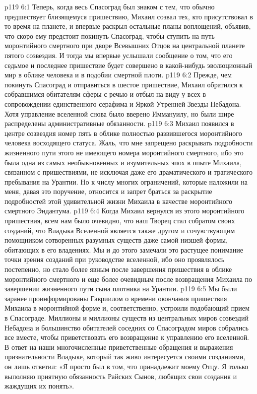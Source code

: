 \vs p119 6:1 Теперь, когда весь Спасоград был знаком с тем, что обычно предшествует близящемуся пришествию, Михаил созвал тех, кто присутствовал в то время на планете, и впервые раскрыл остальные планы воплощений, объявив, что скоро ему предстоит покинуть Спасоград, чтобы ступить на путь моронтийного смертного при дворе Всевышних Отцов на центральной планете пятого созвездия. И тогда мы впервые услышали сообщение о том, что его седьмое и последнее пришествие будет совершено в какой\hyp{}нибудь эволюционный мир в облике человека и в подобии смертной плоти.
\vs p119 6:2 Прежде, чем покинуть Спасоград и отправиться в шестое пришествие, Михаил обратился к собравшимся обитателям сферы с речью и отбыл на виду у всех в сопровождении единственного серафима и Яркой Утренней Звезды Небадона. Хотя управление вселенной снова было вверено Иммануилу, но были шире распределены административные обязанности.
\vs p119 6:3 Михаил появился в центре созвездия номер пять в облике полностью развившегося моронтийного человека восходящего статуса. Жаль, что мне запрещено раскрывать подробности жизненного пути этого не имеющего номера моронтийного смертного, ибо это была одна из самых необыкновенных и изумительных эпох в опыте Михаила, связанном с пришествиями, не исключая даже его драматического и трагического пребывания на Урантии. Но к числу многих ограничений, которые наложили на меня, давая это поручение, относится и запрет браться за раскрытие подробностей этой удивительной жизни Михаила в качестве моронтийного смертного Эндантума.
\vs p119 6:4 Когда Михаил вернулся из этого моронтийного пришествия, всем нам было очевидно, что наш Творец стал собратом своих созданий, что Владыка Вселенной является также другом и сочувствующим помощником сотворенных разумных существ даже самой низшей формы, обитающих в его владениях. Мы и до этого замечали это растущее понимание точки зрения созданий при руководстве вселенной, ибо оно проявлялось постепенно, но стало более явным после завершения пришествия в облике моронтийного смертного и еще более очевидным после возвращения Михаила по завершении жизненного пути сына плотника на Урантии.
\vs p119 6:5 Мы были заранее проинформированы Гавриилом о времени окончания пришествия Михаила в моронтийной форме и, соответственно, устроили подобающий прием в Спасограде. Миллионы и миллионы существ из центральных миров созвездий Небадона и большинство обитателей соседних со Спасоградом миров собрались все вместе, чтобы приветствовать его возвращение к управлению его вселенной. В ответ на наши многочисленные приветственные обращения и выражения признательности Владыке, который так живо интересуется своими созданиями, он лишь ответил: «Я просто был в том, что принадлежит моему Отцу. Я только выполняю приятную обязанность Райских Сынов, любящих свои создания и жаждущих их понять».
